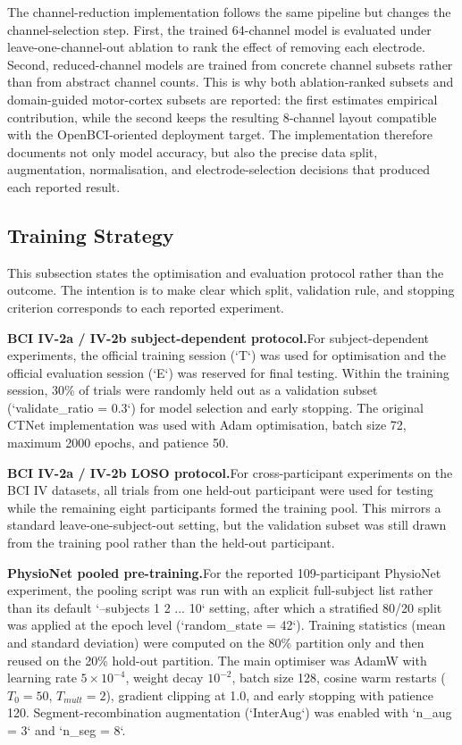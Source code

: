 \documentclass[12pt, a4paper]{article}
\begin{document}
The channel-reduction implementation follows the same pipeline but changes the channel-selection step. First, the trained 64-channel model is evaluated under leave-one-channel-out ablation to rank the effect of removing each electrode. Second, reduced-channel models are trained from concrete channel subsets rather than from abstract channel counts. This is why both ablation-ranked subsets and domain-guided motor-cortex subsets are reported: the first estimates empirical contribution, while the second keeps the resulting 8-channel layout compatible with the OpenBCI-oriented deployment target. The implementation therefore documents not only model accuracy, but also the precise data split, augmentation, normalisation, and electrode-selection decisions that produced each reported result.

\subsection{Training Strategy}

This subsection states the optimisation and evaluation protocol rather than the outcome. The intention is to make clear which split, validation rule, and stopping criterion corresponds to each reported experiment.

\textbf{BCI IV-2a / IV-2b subject-dependent protocol.}\quad For subject-dependent experiments, the official training session (`T`) was used for optimisation and the official evaluation session (`E`) was reserved for final testing. Within the training session, 30\% of trials were randomly held out as a validation subset (`validate\_ratio = 0.3`) for model selection and early stopping. The original CTNet implementation was used with Adam optimisation, batch size 72, maximum 2000 epochs, and patience 50.

\textbf{BCI IV-2a / IV-2b LOSO protocol.}\quad For cross-participant experiments on the BCI IV datasets, all trials from one held-out participant were used for testing while the remaining eight participants formed the training pool. This mirrors a standard leave-one-subject-out setting, but the validation subset was still drawn from the training pool rather than the held-out participant.

\textbf{PhysioNet pooled pre-training.}\quad For the reported 109-participant PhysioNet experiment, the pooling script was run with an explicit full-subject list rather than its default `--subjects 1 2 ... 10` setting, after which a stratified 80/20 split was applied at the epoch level (`random\_state = 42`). Training statistics (mean and standard deviation) were computed on the 80\% partition only and then reused on the 20\% hold-out partition. The main optimiser was AdamW with learning rate $5 \times 10^{-4}$, weight decay $10^{-2}$, batch size 128, cosine warm restarts ($T_0 = 50$, $T_{mult} = 2$), gradient clipping at 1.0, and early stopping with patience 120. Segment-recombination augmentation (`InterAug`) was enabled with `n\_aug = 3` and `n\_seg = 8`.
\end{document}
